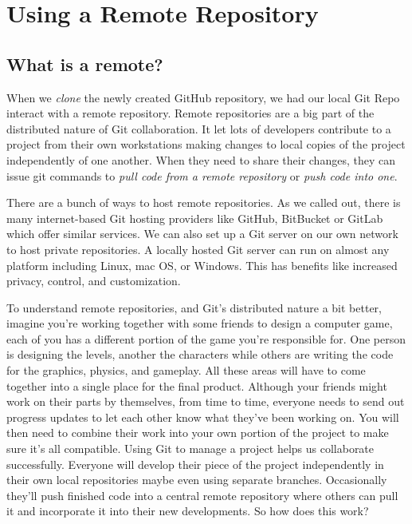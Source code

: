 \section{Using a Remote Repository} \label{W302}

\subsection{What is a remote?} \label{W302a}
When we \textit{clone} the newly created GitHub repository, we had our local Git Repo interact with a remote repository. 
Remote repositories are a big part of the distributed nature of Git collaboration. 
It let lots of developers contribute to a project from their own workstations making changes to local copies of the project independently of one another. 
When they need to share their changes, they can issue git commands to \textit{pull code from a remote repository} or \textit{push code into one}. 

There are a bunch of ways to host remote repositories. As we called out, there is many internet-based Git hosting providers like GitHub, BitBucket or GitLab which offer similar services. We can also set up a Git server on our own network to host private repositories. 
A locally hosted Git server can run on almost any platform including Linux, mac OS, or Windows. This has benefits like increased privacy, control, and customization. 

To understand remote repositories, and Git's distributed nature a bit better, imagine you're working together with some friends to design a computer game, each of you has a different portion of the game you're responsible for. 
One person is designing the levels, another the characters while others are writing the code for the graphics, physics, and gameplay. 
All these areas will have to come together into a single place for the final product. Although your friends might work on their parts by themselves, from time to time, everyone needs to send out progress updates to let each other know what they've been working on. You will then need to combine their work into your own portion of the project to make sure it's all compatible. Using Git to manage a project helps us collaborate successfully. 
Everyone will develop their piece of the project independently in their own local repositories maybe even using separate branches. Occasionally they'll push finished code into a central remote repository where others can pull it and incorporate it into their new developments. So how does this work? 

